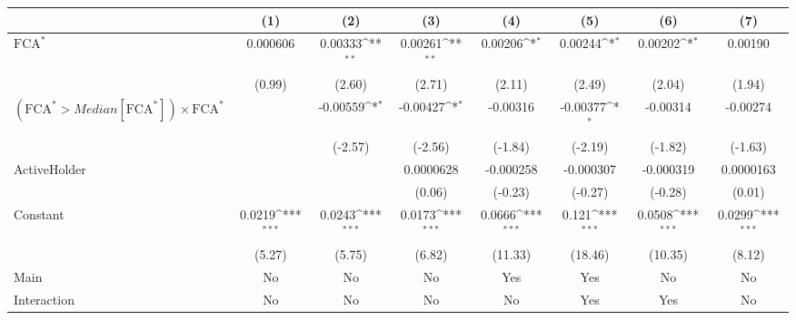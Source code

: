 {
\def\sym#1{\ifmmode^{#1}\else\(^{#1}\)\fi}
\begin{tabular}{l*{7}{c}}
\hline\hline
                    &\multicolumn{1}{c}{(1)}         &\multicolumn{1}{c}{(2)}         &\multicolumn{1}{c}{(3)}         &\multicolumn{1}{c}{(4)}         &\multicolumn{1}{c}{(5)}         &\multicolumn{1}{c}{(6)}         &\multicolumn{1}{c}{(7)}         \\
\hline
$ \text{FCA}^* $    &    0.000606         &     0.00333\sym{**} &     0.00261\sym{**} &     0.00206\sym{*}  &     0.00244\sym{*}  &     0.00202\sym{*}  &     0.00190         \\
                    &      (0.99)         &      (2.60)         &      (2.71)         &      (2.11)         &      (2.49)         &      (2.04)         &      (1.94)         \\
[1em]
 $ (\text{FCA}^* > Median[\text{FCA}^*]) \times {\text{FCA} ^*}  $ &                     &    -0.00559\sym{*}  &    -0.00427\sym{*}  &    -0.00316         &    -0.00377\sym{*}  &    -0.00314         &    -0.00274         \\
                    &                     &     (-2.57)         &     (-2.56)         &     (-1.84)         &     (-2.19)         &     (-1.82)         &     (-1.63)         \\
[1em]
ActiveHolder        &                     &                     &   0.0000628         &   -0.000258         &   -0.000307         &   -0.000319         &   0.0000163         \\
                    &                     &                     &      (0.06)         &     (-0.23)         &     (-0.27)         &     (-0.28)         &      (0.01)         \\
[1em]
Constant            &      0.0219\sym{***}&      0.0243\sym{***}&      0.0173\sym{***}&      0.0666\sym{***}&       0.121\sym{***}&      0.0508\sym{***}&      0.0299\sym{***}\\
                    &      (5.27)         &      (5.75)         &      (6.82)         &     (11.33)         &     (18.46)         &     (10.35)         &      (8.12)         \\
\hline
Main                &          No         &          No         &          No         &         Yes         &         Yes         &          No         &          No         \\
Interaction         &          No         &          No         &          No         &          No         &         Yes         &         Yes         &          No         \\

\end{tabular}}
